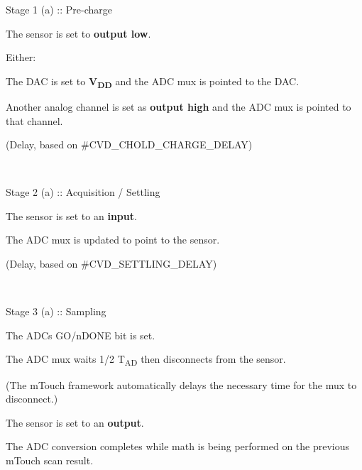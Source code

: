 \begin{DoxyItemize}
\item Stage 1 (a) \+:\+: Pre-\/charge 
\begin{DoxyItemize}
\item The sensor is set to {\bfseries output low}. 
\item Either\+: 
\begin{DoxyItemize}
\item The D\+A\+C is set to {\bfseries V\textsubscript{D\+D}} and the A\+D\+C mux is pointed to the D\+A\+C. 
\item Another analog channel is set as {\bfseries output high} and the A\+D\+C mux is pointed to that channel. 
\end{DoxyItemize}
\item (Delay, based on \#\+C\+V\+D\+\_\+\+C\+H\+O\+L\+D\+\_\+\+C\+H\+A\+R\+G\+E\+\_\+\+D\+E\+L\+A\+Y) 
\end{DoxyItemize}~\newline
~\newline
 
\item Stage 2 (a) \+:\+: Acquisition / Settling 
\begin{DoxyItemize}
\item The sensor is set to an {\bfseries input}. 
\item The A\+D\+C mux is updated to point to the sensor. 
\item (Delay, based on \#\+C\+V\+D\+\_\+\+S\+E\+T\+T\+L\+I\+N\+G\+\_\+\+D\+E\+L\+A\+Y) 
\end{DoxyItemize}~\newline
~\newline
 
\item Stage 3 (a) \+:\+: Sampling 
\begin{DoxyItemize}
\item The A\+D\+C\textquotesingle{}s G\+O/n\+D\+O\+N\+E bit is set. 
\item The A\+D\+C mux waits 1/2 T\textsubscript{A\+D} then disconnects from the sensor. 
\item (The m\+Touch framework automatically delays the necessary time for the mux to disconnect.) 
\item The sensor is set to an {\bfseries output}. 
\end{DoxyItemize}
\end{DoxyItemize}The A\+D\+C conversion completes while math is being performed on the previous m\+Touch scan result. 
